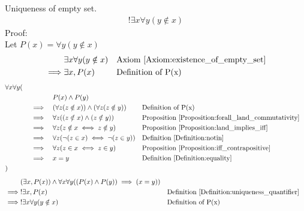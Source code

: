 \begin{prop}
\label{Proposition:uniqueness_of_empty_set}
Uniqueness of empty set.
\begin{align*}
!\exists x \forall y (y \notin x)
\end{align*}
Proof: \\
Let $P(x) = \forall y (y \notin x)$
\begin{align*}
& \exists x \forall y (y \notin x) && \text{Axiom \ref{Axiom:existence_of_empty_set}} \\
\implies & \exists x, P(x) && \text{Definition of P(x)}
\end{align*}
\begin{align*}
& \forall x \forall y ( \\
& \quad && &&  P(x) \land P(y) \\
& \quad && \implies &&  (\forall z (z \notin x)) \land (\forall z (z \notin y))
&& \text{Definition of P(x)} \\
& \quad && \implies && \forall z ((z \notin x) \land (z \notin y))
&& \text{Proposition \ref{Proposition:forall_land_commutativity}} \\
& \quad && \implies && \forall z (z \notin x \iff z \notin y)
&& \text{Proposition \ref{Proposition:land_implies_iff}} \\
& \quad && \implies && \forall z (\lnot(z \in x) \iff \lnot (z \in y))
&& \text{Definition \ref{Definition:notin}} \\
& \quad && \implies && \forall z (z \in x \iff z \in y)
&& \text{Proposition \ref{Proposition:iff_contrapositive}} \\
& \quad && \implies && x = y
&& \text{Definition \ref{Definition:equality}} \\
& )
\end{align*}
\begin{align*}
& (\exists x, P(x)) \land \forall x \forall y ( (P(x) \land P(y)) \implies (x=y) ) \\
\implies & !\exists x, P(x) && \text{Definition \ref{Definition:uniqueness_quantifier}} \\
\implies & !\exists x \forall y (y \notin x) && \text{Definition of P(x)} \\
\end{align*}
\end{prop}

